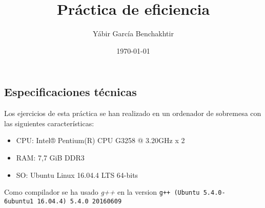 \documentclass[a4paper,12pt]{article}
\begin{document}
\title{Práctica de eficiencia}
\author{Yábir García Benchakhtir}
\date{\today}
\maketitle

\subsection*{Especificaciones técnicas}

\begin{flushleft}
  Los ejercicios de esta práctica se han realizado en un ordenador de
  sobremesa con las siguientes características:
\end{flushleft}

\begin{itemize}
\item CPU: Intel® Pentium(R) CPU G3258 @ 3.20GHz x 2
\item RAM: 7,7 GiB DDR3
\item SO: Ubuntu Linux 16.04.4 LTS 64-bits
\end{itemize}

\begin{flushleft}
  Como compilador se ha usado \textit{g++} en la version \texttt{g++
    (Ubuntu 5.4.0-6ubuntu1~16.04.4) 5.4.0 20160609}
\end{flushleft}


\end{document}
